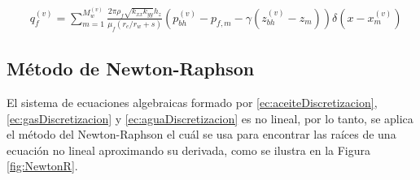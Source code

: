 \begin{align}
	\label{ec:peaceman}&q^{(v)}_{f} = \sum_{m=1}^{M^{(v)}_{w}}\frac{2\pi\rho_{f} \sqrt{k_{xx}k_{yy}}h_{z}}{\mu_{f}\left(r_{e}/r_{w} +s\right)}\left(p_{bh}^{(v)}-p_{f,m}-\gamma\left(z_{bh}^{(v)}-z_{m}\right)\right)\delta\left(x-x_{m}^{(v)}\right)
\end{align}
%
\subsection{Método de Newton-Raphson}
%
El sistema de ecuaciones algebraicas formado por \ref{ec:aceiteDiscretizacion}, \ref{ec:gasDiscretizacion} y \ref{ec:aguaDiscretizacion} es no lineal, por lo tanto, se aplica el método del Newton-Raphson el cuál se usa para encontrar las raíces de una ecuación no lineal aproximando su derivada, como se ilustra en la Figura \ref{fig:NewtonR}.\\

